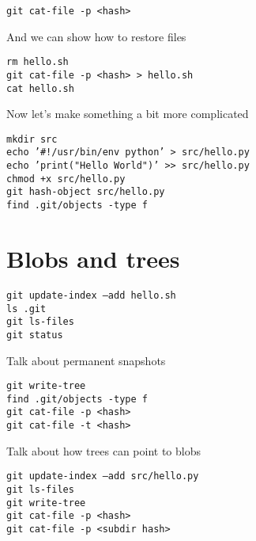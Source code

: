 \documentclass[a4paper,12pt]{article}
\begin{document}
\texttt{git cat-file -p <hash>}

\vspace{0.1in}

And we can show how to restore files

\vspace{0.1in}

\texttt{rm hello.sh\\
git cat-file -p <hash> > hello.sh\\
cat hello.sh}

\vspace{0.1in}

Now let's make something a bit more complicated

\vspace{0.1in}

\texttt{mkdir src\\
echo '\#!/usr/bin/env python' > src/hello.py\\
echo 'print("Hello World")' >> src/hello.py\\
chmod +x src/hello.py\\
git hash-object src/hello.py\\
find .git/objects -type f}

\section*{Blobs and trees}

\texttt{git update-index --add hello.sh\\
ls .git\\
git ls-files\\
git status}

\vspace{0.1in}

Talk about permanent snapshots

\vspace{0.1in}

\texttt{git write-tree\\
find .git/objects -type f\\
git cat-file -p <hash>\\
git cat-file -t <hash>}

\vspace{0.1in}

Talk about how trees can point to blobs

\vspace{0.1in}

\texttt{git update-index --add src/hello.py\\
git ls-files\\
git write-tree\\
git cat-file -p <hash>\\
git cat-file -p <subdir hash>}
\end{document}
